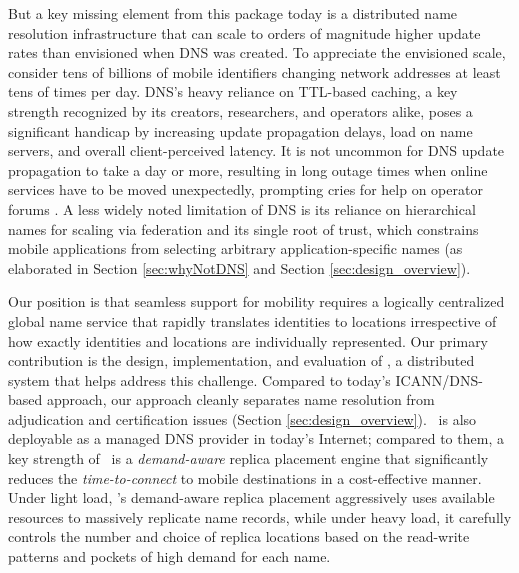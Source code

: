 But a key missing element from this package today is a distributed name resolution infrastructure that can scale to orders of magnitude higher update rates than envisioned when DNS was created. To appreciate the envisioned scale, consider tens of billions of mobile identifiers changing network addresses at least tens of times per day. DNS's heavy reliance on TTL-based caching, a key strength recognized by its creators, researchers, and operators alike, poses a significant handicap by increasing update propagation delays, load on name servers, and overall client-perceived latency. It is not uncommon for DNS update propagation to take a day or more, resulting in long  outage times when online services have to be moved unexpectedly, prompting cries for help on operator forums \cite{serverfault,dns-long-update}. A less widely noted limitation of DNS is its reliance on hierarchical names for scaling via federation and its single root of trust, which constrains mobile applications from selecting arbitrary application-specific names (as elaborated in Section \ref{sec:whyNotDNS} and Section \ref{sec:design_overview}).





Our position is that seamless support for mobility requires a logically centralized global name service that rapidly translates identities to locations irrespective of how exactly identities and locations are individually represented. Our primary contribution is the design, implementation, and evaluation of \auspice, a distributed system that helps address this challenge. Compared to today's ICANN/DNS-based approach, our approach cleanly separates name resolution from adjudication and certification issues (Section \ref{sec:design_overview}). \auspice\ is also deployable as a managed DNS provider in today's Internet; compared to them, a key strength of \auspice\ is a {\em demand-aware} replica placement engine that significantly reduces the {\em time-to-connect} to mobile destinations in a cost-effective manner. Under light load, \auspice's demand-aware replica placement aggressively uses available resources to massively replicate name records, while under heavy load, it carefully controls the number and choice of replica locations based on the read-write patterns and pockets of high demand for each name.

